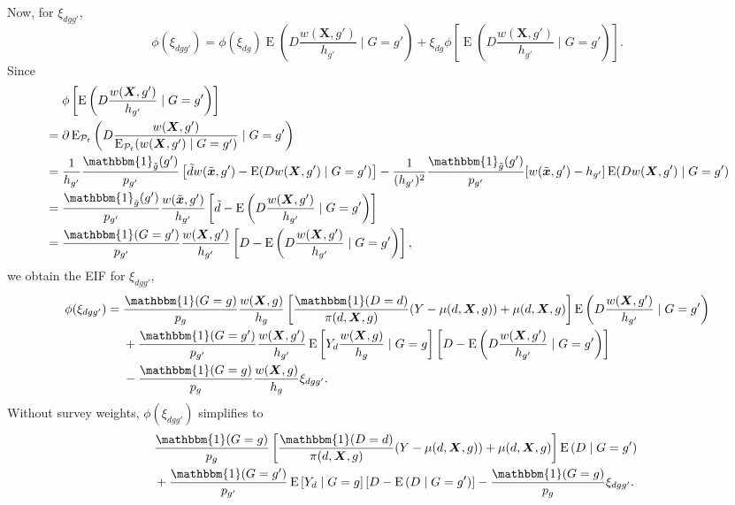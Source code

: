 \documentclass[12pt,a4paper]{article}
\newcommand{\E}{\operatorname{E}}
\def\X{{\boldsymbol X}}
\def\x{{\boldsymbol x}}
\def\one{\mathbbm{1}}
\begin{document}
Now, for $\xi_{dgg'}$, 
\begin{equation*}
    \phi(\xi_{dgg'})=\phi(\xi_{dg})\E \left(D \frac{w(\X,g')}{h_{g'}} \mid G=g' \right) + \xi_{dg} \phi \left[ \E \left(D \frac{w(\X,g')}{h_{g'}} \mid G=g' \right) \right].
\end{equation*}
Since 
\begin{align*}
    &\phantom{{}={}} \phi \left[ \E \left(D \frac{w(\X,g')}{h_{g'}} \mid G=g' \right) \right] \\
    &= \partial \E_{\mathcal{P}_t} \left(D \frac{w(\X,g')}{\E_{\mathcal{P}_t}(w(\X,g')\mid G=g')} \mid G=g' \right) \\
    &= \frac{1}{h_{g'}} \frac{\one_{\Tilde{g}}(g')}{p_{g'}}\left[\Tilde{d} w(\Tilde{\x},g')-\E(Dw(\X,g')\mid G=g') \right] - \frac{1}{(h_{g'})^2}\frac{\one_{\Tilde{g}}(g')}{p_{g'}}[w(\Tilde{\x},g')-h_{g'}]\E(Dw(\X,g')\mid G=g') \\
    &= \frac{\one_{\Tilde{g}}(g')}{p_{g'}} \frac{w(\Tilde{\x},g')}{h_{g'}} \left[ \Tilde{d}-\E \left(D \frac{w(\X,g')}{h_{g'}} \mid G=g' \right) \right] \\
    &= \frac{\one(G=g')}{p_{g'}} \frac{w(\X, g')}{h_{g'}} \left[D - \E \left(D \frac{w(\X,g')}{h_{g'}} \mid G=g' \right) \right] ,
\end{align*}
we obtain the EIF for $\xi_{dgg'}$,
\begin{align*}
    \phi(\xi_{dgg'}) &= \frac{\one(G=g)}{p_g} \frac{w(\X,g)}{h_g} \left[\frac{\one(D=d)}{\pi(d,\X,g)}(Y-\mu(d,\X,g)) + \mu(d,\X,g) \right] \E \left(D \frac{w(\X,g')}{h_{g'}} \mid G=g' \right) \\
    &\phantom{{}={}} + \frac{\one(G=g')}{p_{g'}} \frac{w(\X, g')}{h_{g'}} \E \left[Y_d \frac{w(\X,g)}{h_g} \mid G=g \right]  \left[D - \E \left(D \frac{w(\X,g')}{h_{g'}} \mid G=g' \right) \right] \\
    &\phantom{{}={}} -  \frac{\one(G=g)}{p_g}\frac{w(\X,g)}{h_g} \xi_{dgg'} .
\end{align*}
Without survey weights, $\phi(\xi_{dgg'})$ simplifies to
\begin{align*}
    &\phantom{{}={}} \frac{\one(G=g)}{p_g}  \left[\frac{\one(D=d)}{\pi(d,\X,g)}(Y-\mu(d,\X,g)) + \mu(d,\X,g) \right] \E \left(D \mid G=g' \right) \\
    &\phantom{{}={}} + \frac{\one(G=g')}{p_{g'}} \E \left[Y_d \mid G=g \right] \left[D - \E \left(D \mid G=g' \right) \right] - \frac{\one(G=g)}{p_g} \xi_{dgg'}.
\end{align*}
\end{document}
